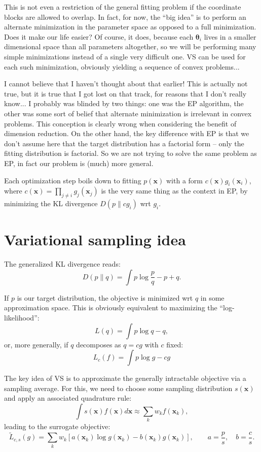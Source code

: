 \documentclass{article}
\def\x{{\mathbf{x}}}
\def\param{{\boldsymbol{\theta}}}
\begin{document}
This is not even a restriction of the general fitting problem if the coordinate blocks are allowed to overlap. In fact, for now, the ``big idea'' is to perform an alternate minimization in the parameter space as opposed to a full minimization. Does it make our life easier? Of course, it does, because each $\param_i$ lives in a smaller dimensional space than all parameters altogether, so we will be performing many simple minimizations instead of a single very difficult one. VS can be used for each such minimization, obviously yielding a sequence of convex problems...

I cannot believe that I haven't thought about that earlier! This is actually not true, but it is true that I got lost on that  track, for reasons that I don't really know... I probably was blinded by two things: one was the EP algorithm, the other was some sort of belief that alternate minimization is irrelevant in convex problems. This conception is clearly wrong when considering the benefit of dimension reduction. On the other hand, the key difference with EP is that we don't assume here that the target distribution has a factorial form -- only the fitting distribution is factorial. So we are not trying to solve the same problem as EP, in fact our problem is (much) more general.

Each optimization step boils down to fitting $p(\x)$ with a form $c(\x)g_i(\x_i)$, where $c(\x)=\prod_{j\not= i}g_j(\x_j)$ is the very same thing as the context in EP, by minimizing the KL divergence $D(p\|cg_i)$ wrt $g_i$.


\section{Variational sampling idea}

The generalized KL divergence reads:
$$
D(p\|q) = \int  p \log \frac{p}{q} - p + q .
$$

If $p$ is our target distribution, the objective is minimized wrt $q$ in some approximation space. This is obviously equivalent to maximizing the ``log-likelihood'':
$$
L(q) = \int p \log q - q,
$$
or, more generally, if $q$ decomposes as $q=c g$ with $c$ fixed:
$$
L_c(f) = \int p \log g - c g
$$

The key idea of VS is to approximate the generally intractable objective via a sampling average. For this, we need to choose some sampling distribution $s(\x)$ and apply an associated quadrature rule:
$$
\int s(\x) f(\x) d\x \approx \sum_k w_k f(\x_k),
$$
leading to the surrogate objective:
$$
\tilde{L}_{c,s}(g)
= 
\sum_k 
w_k
\left[
a(\x_k) \log g(\x_k)
- b(\x_k) g(\x_k)
\right],
\qquad
a = \frac{p}{s},
\quad
b = \frac{c}{s}
.
$$
\end{document}
